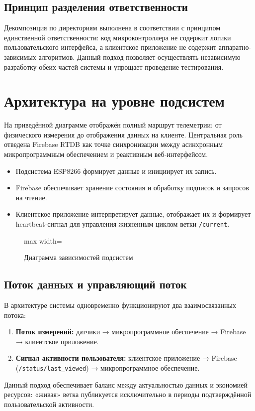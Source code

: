 \subsection{Принцип разделения ответственности}

Декомпозиция по директориям выполнена в соответствии с принципом единственной ответственности: код микроконтроллера не содержит логики пользовательского интерфейса, а клиентское приложение не содержит аппаратно-зависимых алгоритмов. Данный подход позволяет осуществлять независимую разработку обеих частей системы и упрощает проведение тестирования.

\section{Архитектура на уровне подсистем}

На приведённой диаграмме отображён полный маршрут телеметрии: от физического измерения до отображения данных на клиенте. Центральная роль отведена Firebase RTDB как точке синхронизации между асинхронным микропрограммным обеспечением и реактивным веб-интерфейсом.

\begin{itemize}
    \item Подсистема ESP8266 формирует данные и инициирует их запись.
    \item Firebase обеспечивает хранение состояния и обработку подписок и запросов на чтение.
    \item Клиентское приложение интерпретирует данные, отображает их и формирует heartbeat-сигнал для управления жизненным циклом ветки \texttt{/current}.
\end{itemize}

\begin{figure}[htbp]
\centering
\begin{adjustbox}{max width=\textwidth}

\end{adjustbox}
\caption{Диаграмма зависимостей подсистем}
\end{figure}

\subsection{Поток данных и управляющий поток}

В архитектуре системы одновременно функционируют два взаимосвязанных потока:

\begin{enumerate}
    \item \textbf{Поток измерений:} датчики → микропрограммное обеспечение → Firebase → клиентское приложение.
    \item \textbf{Сигнал активности пользователя:} клиентское приложение → Firebase (\texttt{/status/\allowbreak last\_viewed}) → микропрограммное обеспечение.
\end{enumerate}

Данный подход обеспечивает баланс между актуальностью данных и экономией ресурсов: «живая» ветка публикуется исключительно в периоды подтверждённой пользовательской активности.
